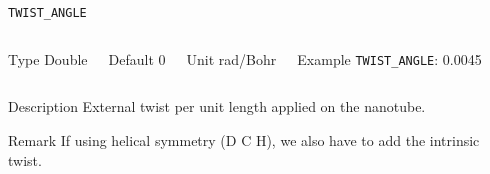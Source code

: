 
%
%

\begin{frame}[allowframebreaks]{\texttt{TWIST\_ANGLE}} \label{TWIST_ANGLE}
\vspace*{-12pt}
\begin{columns}
\begin{block}{Type}
Double
\end{block}

\begin{block}{Default}
0
\end{block}

\begin{block}{Unit}
rad/Bohr
\end{block}

\begin{block}{Example}
\texttt{TWIST\_ANGLE}: 0.0045
\end{block}
\end{columns}

\begin{block}{Description}
External twist per unit length applied on the nanotube.
\end{block}

\begin{block}{Remark}
If using helical symmetry (D C H), we also have to add the intrinsic twist.
\end{block}

\end{frame}

